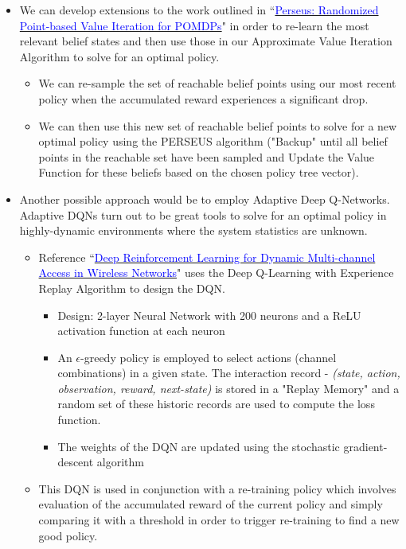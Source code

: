 \documentclass[12pt, draftcls, onecolumn]{IEEEtran}
\begin{document}
\begin{itemize}
    \item We can develop extensions to the work outlined in ``\href{https://arxiv.org/pdf/1109.2145.pdf}{\textcolor{blue}{Perseus: Randomized Point-based Value Iteration for POMDPs}}" in order to re-learn the most relevant belief states and then use those in our Approximate Value Iteration Algorithm to solve for an optimal policy.
    \begin{itemize}
        \item We can re-sample the set of reachable belief points using our most recent policy when the accumulated reward experiences a significant drop.
        \item We can then use this new set of reachable belief points to solve for a new optimal policy using the PERSEUS algorithm ("Backup" until all belief points in the reachable set have been sampled and Update the Value Function for these beliefs based on the chosen policy tree vector).
    \end{itemize}
    \item Another possible approach would be to employ Adaptive Deep Q-Networks. Adaptive DQNs turn out to be great tools to solve for an optimal policy in highly-dynamic environments where the system statistics are unknown.
    \begin{itemize}
        \item Reference ``\href{https://ieeexplore.ieee.org/document/8303773}{\textcolor{blue}{Deep Reinforcement Learning for Dynamic Multi-channel Access in Wireless Networks}}" uses the Deep Q-Learning with Experience Replay Algorithm to design the DQN.
        \begin{itemize}
            \item Design: 2-layer Neural Network with 200 neurons and a ReLU activation function at each neuron
            \item An $\epsilon$-greedy policy is employed to select actions (channel combinations) in a given state. The interaction record - \textit{(state, action, observation, reward, next-state)} is stored in a "Replay Memory" and a random set of these historic records are used to compute the loss function.
            \item The weights of the DQN are updated using the stochastic gradient-descent algorithm
        \end{itemize}
        \item This DQN is used in conjunction with a re-training policy which involves evaluation of the accumulated reward of the current policy and simply comparing it with a threshold in order to trigger re-training to find a new good policy.
    \end{itemize}
\end{itemize}
\end{document}
